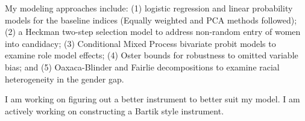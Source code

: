 \documentclass[12pt]{article}
\begin{document}
My modeling approaches include: (1) logistic regression and linear probability models for the baseline indices (Equally weighted and PCA methods followed); (2) a Heckman two-step selection model to address non-random entry of women into candidacy; (3) Conditional Mixed Process bivariate probit models to examine role model effects; (4) Oster bounds for robustness to omitted variable bias; and (5) Oaxaca-Blinder and Fairlie decompositions to examine racial heterogeneity in the gender gap. 

I am working on figuring out a better instrument to better suit my model. I am actively working on constructing a Bartik style instrument. 
\end{document}
